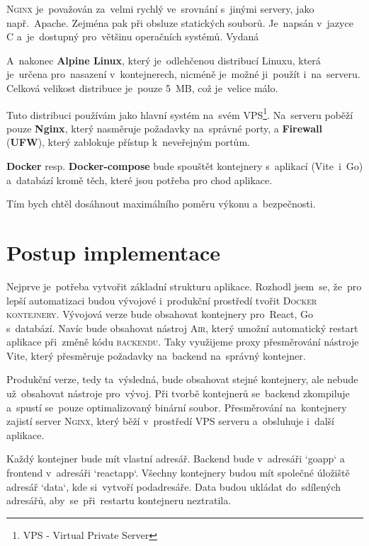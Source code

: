 \documentclass[14pt,a4paper]{article}
\begin{document}
            \textsc{Nginx} je~považován za~velmi rychlý ve~srovnání s~jinými servery, jako např.~Apache. Zejména pak při obsluze statických souborů. Je~napsán v~jazyce C a~je~dostupný pro~většinu operačních systémů. Vydaná  \parencite{WhatNGINX}

            A~nakonec \textbf{Alpine Linux}, který je~odlehčenou distribucí Linuxu, která je~určena pro~nasazení v~kontejnerech, nicméně je~možné ji~použít i~na~serveru. Celková velikost distribuce je~pouze 5~MB, což je~velice málo. 

            Tuto distribuci používám jako hlavní systém na~svém VPS\footnote{VPS - Virtual Private Server}.
            Na~serveru poběží pouze \textbf{Nginx}, který nasměruje požadavky na~správné porty, a \textbf{Firewall} (\textbf{UFW}), který zablokuje přístup k~neveřejným portům.

            \textbf{Docker} resp. \textbf{Docker-compose} bude spouštět kontejnery s~aplikací (Vite~i~Go) a~databází
            kromě těch, které jsou potřeba pro chod aplikace.

            Tím bych chtěl dosáhnout maximálního poměru výkonu a~bezpečnosti.
	
	\section{Postup implementace}
        Nejprve je~potřeba vytvořit základní strukturu aplikace. Rozhodl jsem~se, že~pro lepší automatizaci budou vývojové i~produkční prostředí tvořit \textsc{Docker kontejnery}.
        Vývojová verze bude obsahovat kontejnery pro~React, Go s~databází. Navíc bude obsahovat nástroj \textsc{Air}, který umožní automatický restart aplikace při~změně kódu \textsc{backendu}. Taky využijeme proxy přesměrování nástroje Vite, který přesměruje požadavky na~backend na~správný kontejner.

        Produkční verze, tedy ta~výsledná, bude obsahovat stejné kontejnery, ale nebude už~obsahovat nástroje pro~vývoj. Při tvorbě kontejnerů se~backend zkompiluje a~spustí se~pouze optimalizovaný binární soubor.
        Přesměrování na~kontejnery zajistí server \textsc{Nginx}, který běží v~prostředí VPS serveru a~obsluhuje i~další aplikace.

        Každý kontejner bude mít vlastní adresář. Backend bude v~adresáři `goapp` a frontend v~adresáři `reactapp`. Všechny kontejnery budou mít společné úložiště adresář `data`, kde si~vytvoří podadresáře. Data budou ukládat do~sdílených adresářů, aby~se~při~restartu kontejneru neztratila.
\end{document}
